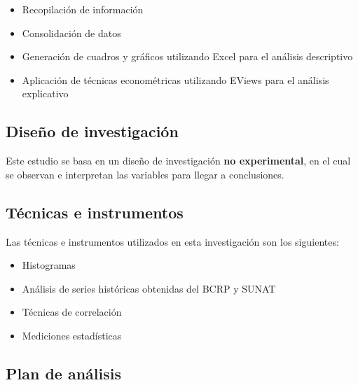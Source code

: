 \documentclass[
  letterpaper,
]{article}
\providecommand{\tightlist}{%
  \setlength{\itemsep}{0pt}\setlength{\parskip}{0pt}}\usepackage{longtable,booktabs,array}
\begin{document}
\begin{itemize}
\tightlist
\item
  Recopilación de información
\item
  Consolidación de datos
\item
  Generación de cuadros y gráficos utilizando Excel para el análisis
  descriptivo
\item
  Aplicación de técnicas econométricas utilizando EViews para el
  análisis explicativo
\end{itemize}

\hypertarget{diseuxf1o-de-investigaciuxf3n}{%
\subsection{Diseño de
investigación}\label{diseuxf1o-de-investigaciuxf3n}}

Este estudio se basa en un diseño de investigación \textbf{no
experimental}, en el cual se observan e interpretan las variables para
llegar a conclusiones.

\hypertarget{tuxe9cnicas-e-instrumentos}{%
\subsection{Técnicas e instrumentos}\label{tuxe9cnicas-e-instrumentos}}

Las técnicas e instrumentos utilizados en esta investigación son los
siguientes:

\begin{itemize}
\tightlist
\item
  Histogramas
\item
  Análisis de series históricas obtenidas del BCRP y SUNAT
\item
  Técnicas de correlación
\item
  Mediciones estadísticas
\end{itemize}

\hypertarget{plan-de-anuxe1lisis}{%
\subsection{Plan de análisis}\label{plan-de-anuxe1lisis}}
\end{document}
